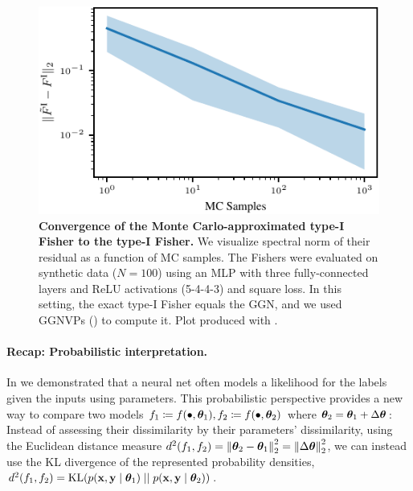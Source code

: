 \switchcolumn[1]

\begin{figure}[!h]
  \centering
  \includegraphics[width=\linewidth]{../kfs/plots/synthetic_rvec_diff_spec_norm.pdf}
  \caption{ \textbf{Convergence of the Monte Carlo-approximated type-I Fisher to the type-I Fisher.}
    We visualize spectral norm of their residual as a function of MC samples.
    The Fishers were evaluated on synthetic data ($N=100$) using an MLP with three fully-connected layers and ReLU activations (5-4-4-3) and square loss.
    In this setting, the exact type-I Fisher equals the GGN, and we used GGNVPs () to compute it.
    Plot produced with .
  }\label{fig:mc-fisher-converges-to-fisher}
\end{figure}

\switchcolumn[0]

\paragraph{Recap: Probabilistic interpretation.}
In  we demonstrated that a neural net often models a likelihood for the labels given the inputs using parameters.
This probabilistic perspective provides a new way to compare two models $f_1 \coloneq f(\bullet, {\bm{\theta}}_1), f_2 \coloneq f(\bullet, {\bm{\theta}}_{2})$ where ${\bm{\theta}}_2 = {\bm{\theta}}_1 + \Delta {\bm{\theta}}$: Instead of assessing their dissimilarity by their parameters' dissimilarity, \eg using the Euclidean distance measure $d^2(f_1, f_2) = \left\lVert {\bm{\theta}}_2 - {\bm{\theta}}_1 \right\rVert_2^2 = \left\lVert \Delta {\bm{\theta}} \right\rVert_2^2$, we can instead use the KL divergence of the represented probability densities, $d^2(f_1, f_2) = \mathrm{KL}(p({\mathbf{x}}, {\mathbf{y}} \mid {\bm{\theta}}_1) \mid\mid p({\mathbf{x}}, {\mathbf{y}} \mid {\bm{\theta}}_2))$.

